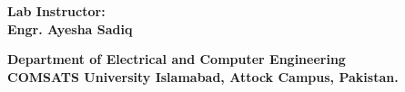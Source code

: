 \begin{titlepage}
\begin{center}
{ \large \bfseries Lab Instructor:} \\[0.1cm]
{ \small \bfseries Engr. Ayesha Sadiq} \\[0.8cm]

\vfill




{ \large \bfseries Department of Electrical and Computer Engineering} \\[0.2cm]
{ \large \bfseries COMSATS University Islamabad, Attock Campus, Pakistan.} \\[0.2cm]



\thispagestyle{empty}
\end{center}
\end{titlepage}

